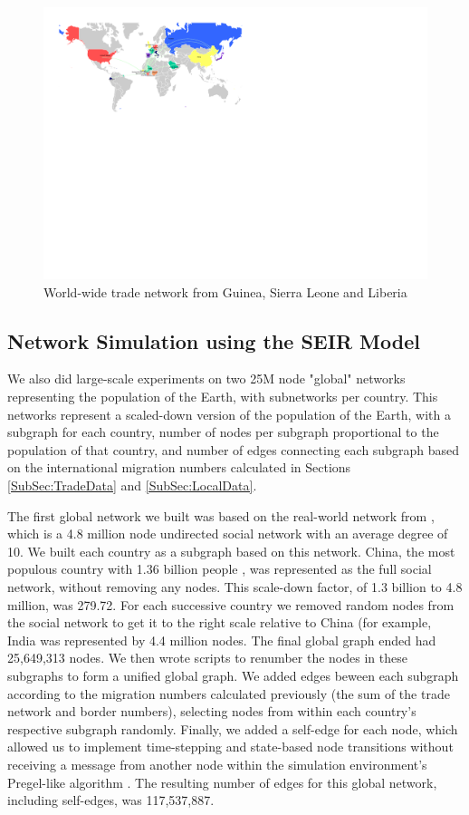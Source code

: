 \documentclass[10pt, journal,onecolumn]{IEEEtran}
\begin{document}
\begin{figure}[ht]
\centering
\includegraphics[scale=1.1]{world1.pdf}
\caption{World-wide trade network from Guinea, Sierra Leone and Liberia}
\label{Fig:worldtrade}
\end{figure}


\subsection{{Network Simulation using the SEIR Model}}
\label{SubSec:GraphX}

We also did large-scale experiments on two 25M node "global" networks representing the population
of the Earth, with subnetworks per country. This networks represent a scaled-down version of the
population of the Earth, with a subgraph for each country, number of nodes per subgraph proportional
to the population of that country, and number of edges connecting each subgraph based on the
international migration numbers calculated in Sections \ref{SubSec:TradeData} and \ref{SubSec:LocalData}.

The first global network we built was based on the real-world network from \citep{topcoderdata},
which is a 4.8 million node undirected social network with an average degree of 10. We built each country
as a subgraph based on this network. China, the most populous country with 1.36 billion people
\citep{ciapopulation}, was represented as the full social network, without removing any nodes.
This scale-down factor, of 1.3 billion to 4.8 million, was 279.72.
For each successive country we removed random
nodes from the social network to get it to the right scale relative to China (for example, India
was represented by 4.4 million nodes. The final global graph ended had 25,649,313 nodes.
We then wrote scripts to renumber the nodes in these subgraphs to form a unified global graph.
We added edges beween each subgraph according to the migration numbers calculated previously
(the sum of the trade network and border numbers),
selecting nodes from within each country's respective subgraph randomly.
Finally, we added a self-edge for each node, which allowed us to implement time-stepping and
state-based node transitions without receiving a message from another node within the simulation
environment's Pregel-like algorithm \citep{malewicz2010pregel}.
The resulting number of edges for this global network, including self-edges, was 117,537,887.
\end{document}
